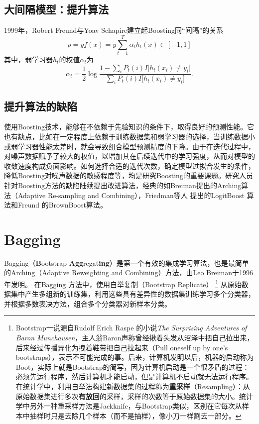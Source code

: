 \subsection{大间隔模型：提升算法}
1999年，Robert Freund与Yoav Schapire\cite{freund1999short}建立起Boosting同“间隔”的关系
\begin{equation}
    \rho = y f(x) = y \sum\limits_{t=1}^T \alpha_t h_t(x)\in [-1,1]
\end{equation}
其中，弱学习器$h_t$的权值$\alpha_t$为
\begin{equation}
    \alpha_t = \frac{1}{2} \log\frac{1-\sum\limits_i P_t(i) I\big[h_t(x_i)\ne y_i\big]}{\sum\limits_i P_t(i) I\big[h_t(x_i)\ne y_i\big]}.
\end{equation}

\subsection{提升算法的缺陷}
使用Boosting技术，能够在不依赖于先验知识的条件下，取得良好的预测性能。它也有缺点，比如在一定程度上依赖于训练数据集和弱学习器的选择，当训练数据小或弱学习器性能太差时，就会导致组合模型预测精度的下降。由于在迭代过程中，对噪声数据赋予了较大的权值，以增加其在后续迭代中的学习强度，从而对模型的收敛速度构成负面影响。如何选择合适的迭代次数，确定模型过拟合发生的条件，降低Boosting对噪声数据的敏感程度等，均是研究Boosting的重要课题。研究人员针对Boosting方法的缺陷陆续提出改进算法，经典的如Breiman\cite{breiman1998arcing}提出的Arching算法（Adaptive Re-sampling and Combining），Friedman等人\cite{friedman2000additive} 提出的LogitBoost 算法和Freund 的BrownBoost算法\cite{freund2001adaptive}。

\section{Bagging}
Bagging（\textbf{B}ootstrap \textbf{Agg}regat\textbf{ing}）是第一个有效的集成学习算法，也是最简单的Arching（Adaptive Reweighting and Combining）方法，由Leo Breiman于1996 年发明\cite{breiman1996bagging}。 在Bagging 方法中，使用自举复制（Bootstrap Replicate）
\footnote{Bootstrap一说源自Rudolf Erich Raspe 的小说\textit{The Surprising Adventures of Baron Munchausen}，主人翁Baron声称曾经揪着头发从沼泽中把自己拉出来，后来经过传播异化为拽着鞋带把自己拉起来（Pull oneself up by one's bootstraps），表示不可能完成的事。后来，计算机发明以后，机器的启动称为Boot，实际上就是Bootstrap的简写，因为计算机启动是一个很矛盾的过程：必须先运行程序，然后计算机才能启动，但是计算机不启动就无法运行程序。在统计学中，利用自举法构建新数据集的过程称为\textbf{重采样}（Resampling）：从原始数据集进行多次\textbf{有放回}的采样，采样的次数等于原始数据集的大小。统计学中另外一种重采样方法是Jackknife，与Bootstrap类似，区别在它每次从样本中抽样时只是去除几个样本（而不是抽样），像小刀一样割去一部分。}
从原始数据集中产生多组新的训练集，利用这些具有差异性的数据集训练学习多个分类器，并根据多数表决方法，组合多个分类器对新样本分类。


